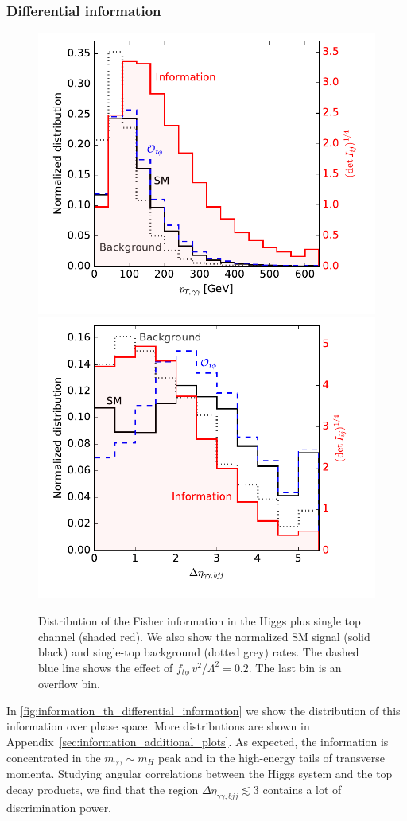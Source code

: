 \subsubsection*{Differential information}

\begin{figure}
  \includegraphics[height=0.45 \textwidth]{fig/information/th_information_over_ptaa}%
  \includegraphics[height=0.45 \textwidth]{fig/information/th_information_over_deltaeta}%
  \caption{Distribution of the Fisher information in the Higgs plus
    single top channel (shaded red). We also show the normalized SM
    signal (solid black) and single-top background (dotted grey)
    rates. The dashed blue line shows the effect of
    $f_{t \phi} \, v^2 / \Lambda^2 = 0.2$. The last bin is an overflow
    bin.}
  \label{fig:information_th_differential_information}
\end{figure}

In \autoref{fig:information_th_differential_information} we show the distribution
of this information over phase space. More distributions are shown in
Appendix~\ref{sec:information_additional_plots}. As expected, the information is
concentrated in the $m_{\gamma \gamma} \sim m_H$ peak and in the
high-energy tails of transverse momenta. Studying angular correlations
between the Higgs system and the top decay products, we find that the
region $\Delta \eta_{ \gamma \gamma, bjj} \lesssim 3$ contains a lot
of discrimination power.




